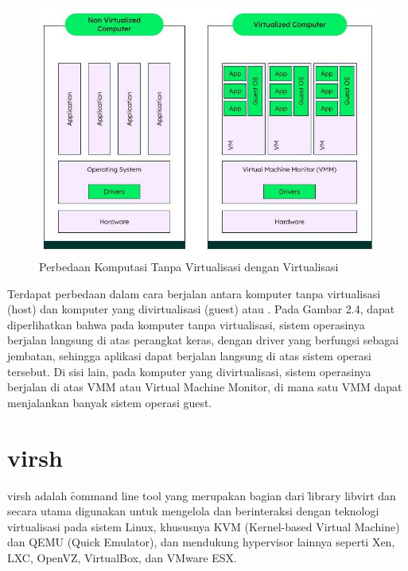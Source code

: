\begin{figure}
	\centering
	\includegraphics[width=1\textwidth]
	{assets/pics/vm-diagram.jpg}
	\caption{Perbedaan Komputasi Tanpa Virtualisasi dengan Virtualisasi}
	\label{fig:vm-diagram}
\end{figure}

Terdapat perbedaan dalam cara berjalan antara komputer tanpa virtualisasi (host) dan komputer yang divirtualisasi (guest) atau \vm. Pada Gambar 2.4, dapat diperlihatkan bahwa pada komputer tanpa virtualisasi, sistem operasinya berjalan langsung di atas perangkat keras, dengan driver yang berfungsi sebagai jembatan, sehingga aplikasi dapat berjalan langsung di atas sistem operasi tersebut. Di sisi lain, pada komputer yang divirtualisasi, sistem operasinya berjalan di atas VMM atau Virtual Machine Monitor, di mana satu VMM dapat menjalankan banyak sistem operasi guest.

\section{virsh}

\hspace{0.5cm} virsh adalah \f{command line tool} yang merupakan bagian dari \f{library} libvirt dan secara utama digunakan untuk mengelola dan berinteraksi dengan teknologi virtualisasi pada sistem Linux, khususnya KVM (Kernel-based Virtual Machine) dan QEMU (Quick Emulator), dan mendukung hypervisor lainnya seperti Xen, LXC, OpenVZ, VirtualBox, dan VMware ESX\cite{libvirtLibvirtVirsh}.

